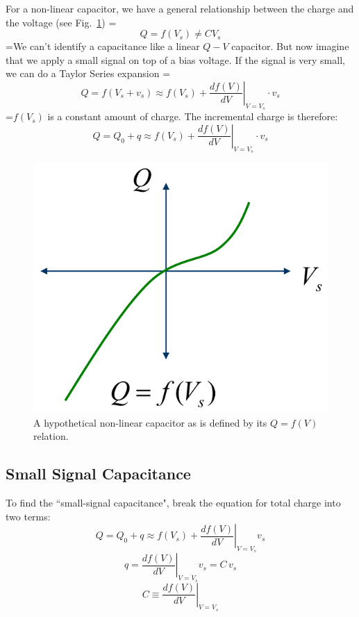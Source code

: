 For a non-linear capacitor, we have a general relationship between the charge and the voltage (see Fig.~\ref{fig:mod2-2_ICtech_sld_20})
=\begin{equation} 
	Q = f({V_s}) \ne C{V_s} 
\end{equation}
=We can’t identify a capacitance like a linear $Q-V$ capacitor.  But now imagine that  we apply a small signal on top of a bias voltage.  If the signal is very small, we can do a Taylor Series expansion
=\begin{equation} 
	Q = f({V_s} + {v_s}) \approx f({V_s}) + {\left. {\frac{{df(V)}}{{dV}}} \right|_{V = {V_s}}} \cdot {v_s} 
\end{equation}
=$f(V_s)$ is a constant amount of charge.  The incremental charge is therefore:
\begin{equation} 
	Q = {Q_0} + q \approx f({V_s}) + {\left. {\frac{{df(V)}}{{dV}}} \right|_{V = {V_s}}} \cdot {v_s} 
\end{equation}
\begin{figure}[tb]
\begin{center}
\includegraphics[width=.35\columnwidth]{mod2-2_ICtech_sld_20} 
\end{center}
\caption{A hypothetical non-linear capacitor as is defined by its $Q = f(V)$ relation.} \label{fig:mod2-2_ICtech_sld_20}
\end{figure}
\subsection{Small Signal Capacitance}
To find the ``small-signal capacitance", break the equation for total charge into two terms:
\begin{equation} 
	Q = {Q_0} + q \approx f({V_s}) + {\left. {\frac{{df(V)}}{{dV}}} \right|_{V = {V_s}}}{v_s} 
\end{equation}
\begin{equation} 
	q = {\left. {\frac{{df(V)}}{{dV}}} \right|_{V = {V_s}}}{v_s} = C\,{v_s} 
\end{equation}
\begin{equation} 
	C \equiv {\left. {\frac{{df(V)}}{{dV}}} \right|_{V = {V_s}}} 
\end{equation}
